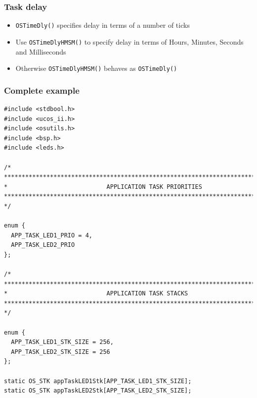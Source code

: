 \documentclass[hyperref={pdfpagelabels=false},svgnames]{beamer}
\begin{document}
\begin{frame}[fragile]
\frametitle{Task delay}
\begin{itemize}
\item \verb'OSTimeDly()' specifies delay in terms of a number of ticks
\item Use \verb'OSTimeDlyHMSM()' to specify delay in terms of \alert{H}ours,
 \alert{M}inutes, \alert{S}econds and \alert{M}illiseconds
\item Otherwise \verb'OSTimeDlyHMSM()' behaves as \verb'OSTimeDly()'
\end{itemize}
\end{frame}

\lstset{basicstyle=\tiny}

\begin{frame}[fragile]
\frametitle{Complete example}

\begin{lstlisting}
#include <stdbool.h>
#include <ucos_ii.h>
#include <osutils.h>
#include <bsp.h>
#include <leds.h>

/*
********************************************************************************
*                            APPLICATION TASK PRIORITIES
********************************************************************************
*/

enum {
  APP_TASK_LED1_PRIO = 4,
  APP_TASK_LED2_PRIO 
};

/*
********************************************************************************
*                            APPLICATION TASK STACKS
********************************************************************************
*/

enum {
  APP_TASK_LED1_STK_SIZE = 256,
  APP_TASK_LED2_STK_SIZE = 256 
};

static OS_STK appTaskLED1Stk[APP_TASK_LED1_STK_SIZE];
static OS_STK appTaskLED2Stk[APP_TASK_LED2_STK_SIZE];
\end{lstlisting}

\end{frame}
\end{document}
